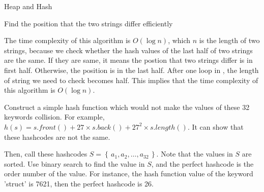 \begin{homeworkProblem}{Heap and Hash}
    \begin{algorithm}[]
        \begin{algorithmic}[1]
                    \Else
                    \EndIf
                \EndWhile
            \EndFunction{}
        \end{algorithmic}
        \caption{Find the position that the two strings differ efficiently}
    \end{algorithm}
    The time complexity of this algorithm is $O(\log n)$, which $n$ is the length
    of two strings, because we check whether the hash values of the last half of 
    two strings are the same. If they are same, it means the postion that two 
    strings differ is in first half. Otherwise, the position is in the last half.
    After one loop in , the length of string we need to check becomes
    half. This implies that the time complexity of this algorithm is $O(\log n)$.


        Construct a simple hash function which would not make the values of 
        these 32 keywords collision. For example, 
        $h(s) = s.front() + 27 \times s.back() + 27^2 \times s.length()$.
        It can show that these hashcodes are not the same.
        
        Then, call these hashcodes $S = \left\{\,a_1, a_2, \hdots, a_{32}\,\right\}$.
        Note that the values in $S$ are sorted. Use binary search to find the value
        in $S$, and the perfect hashcode is the order number of the value. For 
        instance, the hash function value of the keyword 'struct' is 7621, then
        the perfect hashcode is 26.


\end{homeworkProblem}
